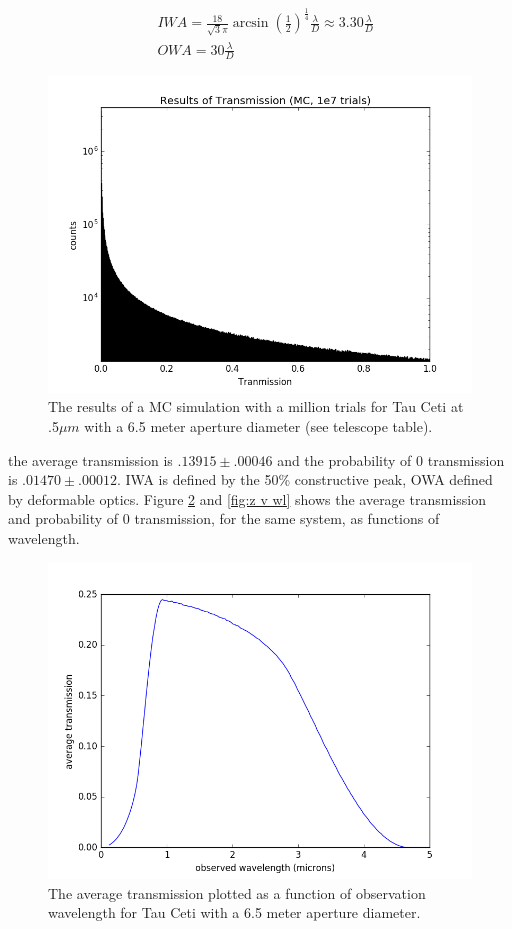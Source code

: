 \documentclass{article}
\begin{document}
	\begin{align*}
	&IWA =  \frac{18}{\sqrt{3}\pi}\arcsin{\left(\frac{1}{2}\right)^{\frac{1}{4}}}\frac{\lambda}{D} \approx 3.30 \frac{\lambda}{D}\\
	&OWA = 30 \frac{\lambda}{D}
	\end{align*}
	
	\begin{figure}
		\includegraphics[width =\linewidth]{p_T.png}
		\caption{The results of a MC simulation with a million trials for Tau Ceti at .5$\mu m$ with a 6.5 meter aperture diameter (see telescope table).}
		\label{fig:p_T}
	\end{figure}
	
the average transmission is $.13915 \pm .00046$ and the probability of 0 transmission is $.01470 \pm .00012$. IWA is defined by the 50\% constructive peak, OWA defined by deformable optics. Figure \ref{fig:T v wl} and \ref{fig:z v wl} shows the average transmission and probability of 0 transmission, for the same system, as functions of wavelength.
	
	\begin{figure}
		\includegraphics[width = \linewidth]{T_wl.png}
		\caption{The average transmission plotted as a function of observation wavelength for Tau Ceti with a 6.5 meter aperture diameter.}
		\label{fig:T v wl}
	\end{figure}
	
\end{document}
